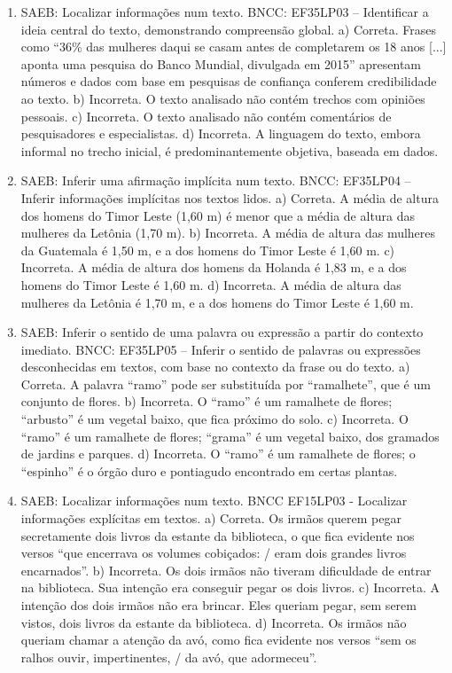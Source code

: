 \begin{enumerate}
\item
SAEB: Localizar informações num texto.
BNCC: EF35LP03 -- Identificar a ideia central do texto, demonstrando
compreensão global.
a) Correta. Frases como ``36\% das mulheres daqui se casam
antes de completarem os 18 anos {[}...{]} aponta uma pesquisa do Banco
Mundial, divulgada em 2015'' apresentam números e dados com base em
pesquisas de confiança conferem credibilidade ao texto.
b) Incorreta. O texto analisado não contém trechos com opiniões pessoais.
c) Incorreta. O texto analisado não contém comentários de pesquisadores e especialistas.
d)  Incorreta. A linguagem do texto, embora informal no trecho inicial,
é predominantemente objetiva, baseada em dados.

\item
SAEB: Inferir uma afirmação implícita num texto. BNCC: EF35LP04 -- Inferir informações implícitas nos textos lidos. a)  Correta. A média de altura dos homens do Timor Leste (1,60 m) é menor que a média de altura das mulheres da Letônia (1,70 m). b)  Incorreta. A média de altura das mulheres da Guatemala é 1,50 m, e a dos homens do Timor Leste é 1,60 m. c)  Incorreta. A média de altura dos homens da Holanda é 1,83 m, e a dos homens do Timor Leste é 1,60 m. d)  Incorreta. A média de altura das mulheres da Letônia é 1,70 m, e a dos homens do Timor Leste é 1,60 m.

\item
SAEB: Inferir o sentido de uma palavra ou expressão a partir do contexto imediato. BNCC: EF35LP05 -- Inferir o sentido de palavras ou expressões desconhecidas em textos, com base no contexto da frase ou do texto. a)  Correta. A palavra ``ramo'' pode ser substituída por ``ramalhete'', que é um conjunto de flores. b)  Incorreta. O ``ramo'' é um ramalhete de flores; ``arbusto'' é um vegetal baixo, que fica próximo do solo. c)  Incorreta. O ``ramo'' é um ramalhete de flores; ``grama'' é um vegetal baixo, dos gramados de jardins e parques. d)  Incorreta. O ``ramo'' é um ramalhete de flores; o ``espinho'' é o órgão duro e pontiagudo encontrado em certas plantas.

\item
SAEB: Localizar informações num texto. BNCC EF15LP03 - Localizar informações explícitas em textos. a) Correta. Os irmãos querem pegar secretamente dois livros da estante da biblioteca, o que fica evidente nos versos ``que encerrava os volumes cobiçados: / eram dois grandes livros encarnados''. b) Incorreta. Os dois irmãos não tiveram dificuldade de entrar na biblioteca. Sua intenção era conseguir pegar os dois livros. c) Incorreta. A intenção dos dois irmãos não era brincar. Eles queriam pegar, sem serem vistos, dois livros da estante da biblioteca. d)  Incorreta. Os irmãos não queriam chamar a atenção da avó, como fica evidente nos versos ``sem os ralhos ouvir, impertinentes, / da avó, que adormeceu''.


\end{enumerate}
